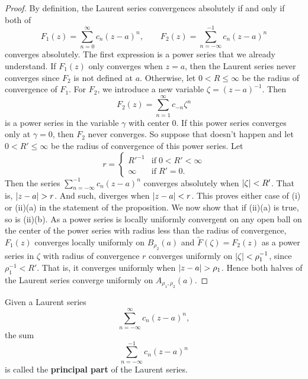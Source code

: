 \begin{proof}
    By definition, the Laurent series convergences absolutely
    if and only if both of
    \[
        F_1(z) = \sum^{\infty}_{n=0} c_n(z-a)^n, \qquad
        F_2(z) = \sum^{-1}_{n=-\infty} c_n(z-a)^n
    \]
    converges absolutely.
    The first expression is a power series that we already understand.
    If $F_1(z)$ only converges when $z = a$, then the Laurent series
    never converges since $F_2$ is not defined at $a$.
    Otherwise, let $0 < R \leq \infty$ be the radius of convergence of
    $F_1$.
    For $F_2$, we introduce a new variable $\zeta = (z - a)^{-1}$.
    Then
    \[
        F_2(z) = \sum^{\infty}_{n = 1} c_{-n} \zeta^n
    \]
    is a power series in the variable $\gamma$ with center $0$.
    If this power series converges only at $\gamma = 0$, then
    $F_2$ never converges. 
    So suppose that doesn't happen and let 
    $0 < R' \leq \infty$ be the radius of convergence of this 
    power series.
    Let
    \[
        r=
        \begin{cases}
            R'^{-1} & \text{if}\; 0<R'<\infty \\
            \infty  & \text{if}\; R'=0.
        \end{cases}
    \]
    Then the series $\sum_{n = -\infty}^{-1} c_n(z-a)^n$ 
    converges absolutely when $\left\lvert\zeta\right\rvert < R'$.
    That is, $\left\lvert z-a\right\rvert > r$.
    And such, diverges when $\left\lvert z-a\right\rvert < r$.
    This proves either case of (i) or (ii)(a) in the statement
    of the proposition.
    We now show that if (ii)(a) is true, so is (ii)(b).
    As a power series is locally uniformly convergent on any
    open ball on the center of the power series with radius less
    than the radius of convergence,
    $F_1(z)$ converges locally uniformly on $B_{\rho_2}(a)$ and
    $\tilde F(\zeta) = F_2(z)$ as a power series in $\zeta$
    with radius of convergence $r$ converges uniformly on 
    $\left\lvert\zeta\right\rvert < \rho_1^{-1}$, since $\rho_1^{-1} < R'$.
    That is, it converges uniformly when $\left\lvert z-a\right\rvert > \rho_1$.
    Hence both halves of the Laurent series converge uniformly
    on $A_{\rho_1,\rho_2}(a)$.
\end{proof}

\begin{definition}[]
    Given a Laurent series 
    \[
        \sum_{n = -\infty}^\infty c_n (z - a)^n,
    \]
    the sum 
    \[
        \sum_{n = -\infty}^{-1} c_n (z-a)^n
    \]
    is called the \textbf{principal part} of the Laurent series.
\end{definition}

